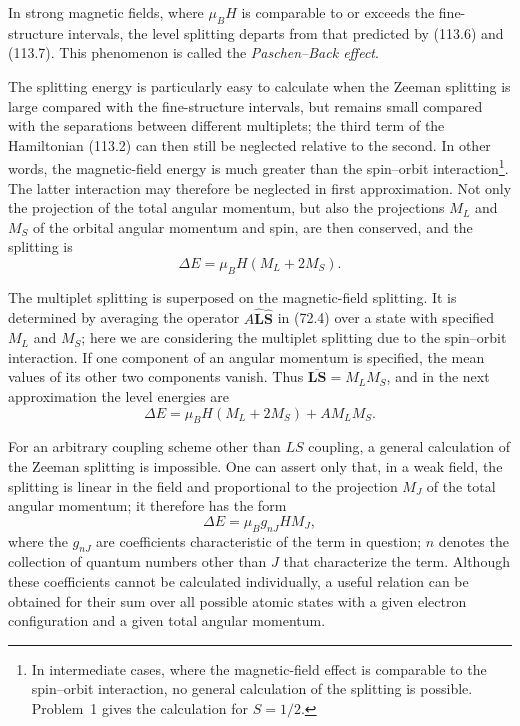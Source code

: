 In strong magnetic fields, where $\mu_BH$ is comparable to or exceeds the fine-structure intervals, the level splitting departs from that predicted by (113.6) and (113.7). This phenomenon is called the \emph{Paschen--Back effect}.

The splitting energy is particularly easy to calculate when the Zeeman splitting is large compared with the fine-structure intervals, but remains small compared with the separations between different multiplets; the third term of the Hamiltonian (113.2) can then still be neglected relative to the second. In other words, the magnetic-field energy is much greater than the spin--orbit interaction\footnote{In intermediate cases, where the magnetic-field effect is comparable to the spin--orbit interaction, no general calculation of the splitting is possible. Problem~1 gives the calculation for $S=1/2$.}. The latter interaction may therefore be neglected in first approximation. Not only the projection of the total angular momentum, but also the projections $M_L$ and $M_S$ of the orbital angular momentum and spin, are then conserved, and the splitting is
\begin{equation}
 \Delta E=\mu_BH(M_L+2M_S).
 \tag{113.13}
\end{equation}

The multiplet splitting is superposed on the magnetic-field splitting. It is determined by averaging the operator $A\hat{\mathbf L}\hat{\mathbf S}$ in (72.4) over a state with specified $M_L$ and $M_S$; here we are considering the multiplet splitting due to the spin--orbit interaction. If one component of an angular momentum is specified, the mean values of its other two components vanish. Thus $\overline{\mathbf L\mathbf S}=M_LM_S$, and in the next approximation the level energies are
\begin{equation}
 \Delta E=\mu_BH(M_L+2M_S)+AM_LM_S.
 \tag{113.14}
\end{equation}

For an arbitrary coupling scheme other than $LS$ coupling, a general calculation of the Zeeman splitting is impossible. One can assert only that, in a weak field, the splitting is linear in the field and proportional to the projection $M_J$ of the total angular momentum; it therefore has the form
\begin{equation}
 \Delta E=\mu_Bg_{nJ}HM_J,
 \tag{113.15}
\end{equation}
where the $g_{nJ}$ are coefficients characteristic of the term in question; $n$ denotes the collection of quantum numbers other than $J$ that characterize the term. Although these coefficients cannot be calculated individually, a useful relation can be obtained for their sum over all possible atomic states with a given electron configuration and a given total angular momentum.

